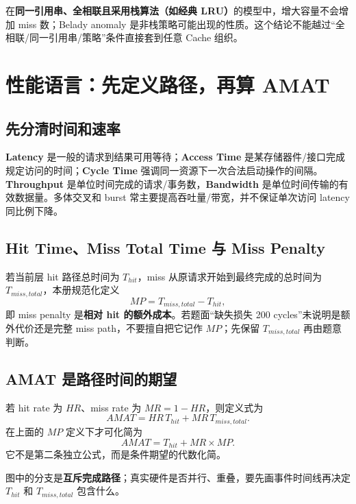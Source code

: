 \documentclass[UTF8,fontset=fandol,11pt,a4paper]{ctexart}
\newcommand{\kw}[1]{\textbf{\color{deep}#1}}\newcommand{\code}[1]{\texttt{#1}}
\begin{document}
在\textbf{同一引用串、全相联且采用栈算法（如经典 LRU）}的模型中，增大容量不会增加 miss 数；Belady anomaly 是非栈策略可能出现的性质。这个结论不能越过“全相联/同一引用串/策略”条件直接套到任意 Cache 组织。

\section{性能语言：先定义路径，再算 AMAT}
\subsection{先分清时间和速率}
\kw{Latency} 是一般的请求到结果可用等待；\kw{Access Time} 是某存储器件/接口完成规定访问的时间；\kw{Cycle Time} 强调同一资源下一次合法启动操作的间隔。\kw{Throughput} 是单位时间完成的请求/事务数，\kw{Bandwidth} 是单位时间传输的有效数据量。多体交叉和 burst 常主要提高吞吐量/带宽，并不保证单次访问 latency 同比例下降。

\subsection{Hit Time、Miss Total Time 与 Miss Penalty}
若当前层 hit 路径总时间为 $T_{hit}$，miss 从原请求开始到最终完成的总时间为 $T_{miss,total}$，本册规范化定义
\[
MP=T_{miss,total}-T_{hit},
\]
即 miss penalty 是\textbf{相对 hit 的额外成本}。若题面“缺失损失 200 cycles”未说明是额外代价还是完整 miss path，不要擅自把它记作 $MP$；先保留 $T_{miss,total}$ 再由题意判断。

\subsection{AMAT 是路径时间的期望}
若 hit rate 为 $HR$、miss rate 为 $MR=1-HR$，则定义式为
\[
AMAT=HR\,T_{hit}+MR\,T_{miss,total}.
\]
在上面的 $MP$ 定义下才可化简为
\[
\boxed{AMAT=T_{hit}+MR\times MP}.
\]
它不是第二条独立公式，而是条件期望的代数化简。

\begin{center}
\end{center}
图中的分支是\textbf{互斥完成路径}；真实硬件是否并行、重叠，要先画事件时间线再决定 $T_{hit}$ 和 $T_{miss,total}$ 包含什么。
\end{document}
